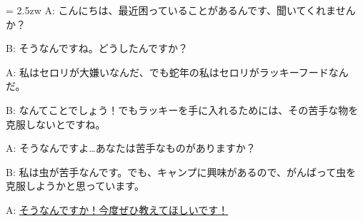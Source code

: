 \documentclass[11pt]{amsart}
\title{}
\author{}
\newenvironment{hangall}[1]{\hangindent = 2.5zw\everypar{\hangindent = 2.5zw}}{}
\begin{document}
\maketitle
\begin{hangall}{}%
A: こんにちは、最近困っていることがあるんです、聞いてくれませんか？

B: そうなんですね。どうしたんですか？

A: 私はセロリが大嫌いなんだ、でも蛇年の私はセロリがラッキーフードなんだ。

B: なんてことでしょう！でもラッキーを手に入れるためには、その苦手な物を克服しないとですね。

A: そうなんですよ…あなたは苦手なものがありますか？

B: 私は虫が苦手なんです。でも、キャンプに興味があるので、がんばって虫を克服しようかと思っています。

A: \ul{そうなんですか！今度ぜひ教えてほしいです！}\end{hangall}
\end{document}
